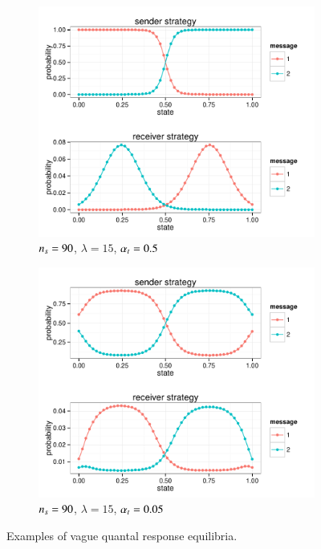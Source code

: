 \begin{figure}
  \centering
  
  \begin{subfigure}[]{0.45\textwidth}
    \includegraphics[width=\textwidth]{plots/exampleStratQRE_tolerance05.pdf}
    \caption{$n_s = 90$, $\lambda = 15$, $\alpha_t = 0.5$}
    \label{fig:exampleQRE_stratsA}
  \end{subfigure}
  \hfill
  \begin{subfigure}[]{0.45\textwidth}
    \includegraphics[width=\textwidth]{plots/exampleStratQRE_tolerance005.pdf}
    \caption{$n_s = 90$, $\lambda = 15$, $\alpha_t = 0.05$}
    \label{fig:exampleQRE_stratsB}
  \end{subfigure}

  \caption{Examples of vague quantal response equilibria.}
  \label{fig:exampleQREs}
\end{figure}








